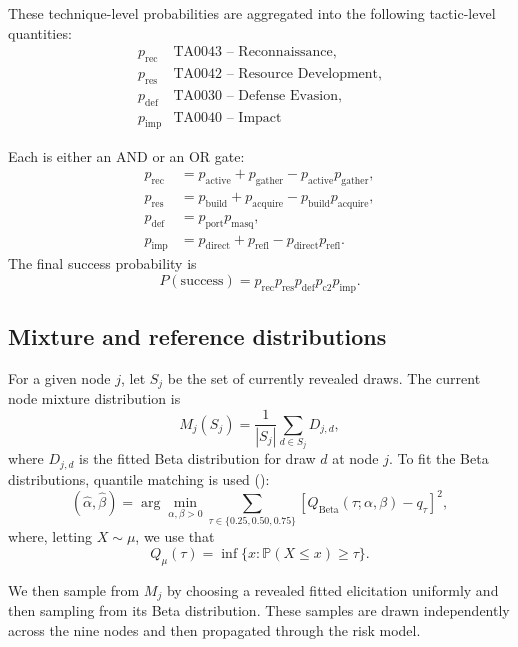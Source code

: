 \documentclass[11pt]{article}
\newcommand{\psuccess}{P(\text{success})}
\begin{document}
These technique-level probabilities are aggregated into the following tactic-level quantities:
\[
\begin{array}{ll}
p_{\mathrm{rec}} & \text{TA0043 -- Reconnaissance},\\
p_{\mathrm{res}} & \text{TA0042 -- Resource Development},\\
p_{\mathrm{def}} & \text{TA0030 -- Defense Evasion},\\
p_{\mathrm{imp}} & \text{TA0040 -- Impact}
\end{array}
\]

Each is either an AND or an OR gate:
\begin{align*}
p_{\mathrm{rec}} &= p_{\mathrm{active}} + p_{\mathrm{gather}} - p_{\mathrm{active}}p_{\mathrm{gather}}, \tag*{(OR gate)}\\
p_{\mathrm{res}} &= p_{\mathrm{build}} + p_{\mathrm{acquire}} - p_{\mathrm{build}}p_{\mathrm{acquire}}, \tag*{(OR gate)}\\
p_{\mathrm{def}} &= p_{\mathrm{port}}p_{\mathrm{masq}}, \tag*{(AND gate)}\\
p_{\mathrm{imp}} &= p_{\mathrm{direct}} + p_{\mathrm{refl}} - p_{\mathrm{direct}}p_{\mathrm{refl}} \tag*{(OR gate)}.
\end{align*}
The final success probability is
\[
\psuccess
=
p_{\mathrm{rec}}p_{\mathrm{res}}p_{\mathrm{def}}p_{\mathrm{c2}}p_{\mathrm{imp}}.
\]

\subsection{Mixture and reference distributions}

For a given node $j$, let $S_j$ be the set of currently revealed draws. The current node mixture distribution is
\[
M_j(S_j)=\frac{1}{|S_j|}\sum_{d\in S_j}D_{j,d},
\]
where $D_{j,d}$ is the fitted Beta distribution for draw $d$ at node $j$. To fit the Beta distributions, quantile matching is used (\cite{sgouropoulos2015matching}):
\[
(\hat{\alpha},\hat{\beta})
=
\arg\min_{\alpha,\beta>0}
\sum_{\tau \in \{0.25,0.50,0.75\}}
\left[
Q_{\mathrm{Beta}}(\tau;\alpha,\beta)-q_{\tau}
\right]^2,
\]
where, letting $X \sim \mu$, we use that \[Q_{\mu}(\tau) = \inf\{x: \mathbb{P}(X\leq x) \geq \tau\}.\]

We then sample from $M_j$ by choosing a revealed fitted elicitation uniformly and then sampling from its Beta distribution. These samples are drawn independently across the nine nodes and then propagated through the risk model.
\end{document}
